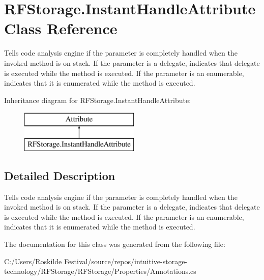 \section{R\+F\+Storage.\+Instant\+Handle\+Attribute Class Reference}
\label{class_r_f_storage_1_1_instant_handle_attribute}


Tells code analysis engine if the parameter is completely handled when the invoked method is on stack. If the parameter is a delegate, indicates that delegate is executed while the method is executed. If the parameter is an enumerable, indicates that it is enumerated while the method is executed.  


Inheritance diagram for R\+F\+Storage.\+Instant\+Handle\+Attribute\+:\begin{figure}[H]
\begin{center}
\leavevmode
\includegraphics[height=2.000000cm]{class_r_f_storage_1_1_instant_handle_attribute}
\end{center}
\end{figure}


\subsection{Detailed Description}
Tells code analysis engine if the parameter is completely handled when the invoked method is on stack. If the parameter is a delegate, indicates that delegate is executed while the method is executed. If the parameter is an enumerable, indicates that it is enumerated while the method is executed. 



The documentation for this class was generated from the following file\+:\begin{DoxyCompactItemize}
\item 
C\+:/\+Users/\+Roskilde Festival/source/repos/intuitive-\/storage-\/technology/\+R\+F\+Storage/\+R\+F\+Storage/\+Properties/Annotations.\+cs\end{DoxyCompactItemize}
